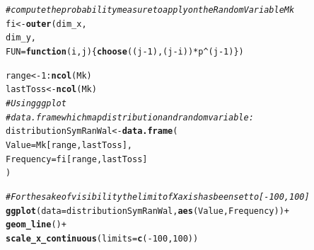 \documentclass{article}\usepackage[]{graphicx}\usepackage[]{color}
\makeatletter
\newcommand{\hlnum}[1]{\textcolor[rgb]{0.686,0.059,0.569}{#1}}%
\newcommand{\hlcom}[1]{\textcolor[rgb]{0.678,0.584,0.686}{\textit{#1}}}%
\newcommand{\hlopt}[1]{\textcolor[rgb]{0,0,0}{#1}}%
\newcommand{\hlstd}[1]{\textcolor[rgb]{0.345,0.345,0.345}{#1}}%
\newcommand{\hlkwa}[1]{\textcolor[rgb]{0.161,0.373,0.58}{\textbf{#1}}}%
\newcommand{\hlkwb}[1]{\textcolor[rgb]{0.69,0.353,0.396}{#1}}%
\newcommand{\hlkwc}[1]{\textcolor[rgb]{0.333,0.667,0.333}{#1}}%
\newcommand{\hlkwd}[1]{\textcolor[rgb]{0.737,0.353,0.396}{\textbf{#1}}}%
\newenvironment{kframe}{%
 \def\at@end@of@kframe{}%
 \ifinner\ifhmode%
  \def\at@end@of@kframe{\end{minipage}}%
  \begin{minipage}{\columnwidth}%
 \fi\fi%
 \def\FrameCommand##1{\hskip\@totalleftmargin \hskip-\fboxsep
 \colorbox{shadecolor}{##1}\hskip-\fboxsep
     \hskip-\linewidth \hskip-\@totalleftmargin \hskip\columnwidth}%
 \MakeFramed {\advance\hsize-\width
   \@totalleftmargin\z@ \linewidth\hsize
   \@setminipage}}%
 {\par\unskip\endMakeFramed%
 \at@end@of@kframe}
\newenvironment{knitrout}{}{} %
\makeatother
\begin{document}
\begin{knitrout}
\color{fgcolor}\begin{kframe}
\begin{alltt}
\hlcom{# compute the probability measure to apply on the Random Variable Mk}
\hlstd{fi} \hlkwb{<-} \hlkwd{outer}\hlstd{(dim_x,}
            \hlstd{dim_y,}
            \hlkwc{FUN} \hlstd{=} \hlkwa{function}\hlstd{(}\hlkwc{i}\hlstd{,} \hlkwc{j}\hlstd{)\{}\hlkwd{choose}\hlstd{((j}\hlopt{-}\hlnum{1}\hlstd{), (j}\hlopt{-}\hlstd{i))} \hlopt{*} \hlstd{p}\hlopt{^}\hlstd{(j}\hlopt{-}\hlnum{1}\hlstd{)\})}
\end{alltt}
\end{kframe}
\end{knitrout}

\begin{knitrout}
\color{fgcolor}\begin{kframe}
\begin{alltt}
 \hlstd{range} \hlkwb{<-} \hlnum{1}\hlopt{:}\hlkwd{ncol}\hlstd{(Mk)}
\hlstd{lastToss} \hlkwb{<-} \hlkwd{ncol}\hlstd{(Mk)}
 \hlcom{# Using ggplot}
\hlcom{# data.frame which map distribution and random variable:}
\hlstd{distributionSymRanWal} \hlkwb{<-} \hlkwd{data.frame}\hlstd{(}
  \hlkwc{Value} \hlstd{= Mk[range, lastToss],}
  \hlkwc{Frequency} \hlstd{= fi[range, lastToss]}
\hlstd{)}

\hlcom{# For the sake of visibility the limit of X axis has been set to [-100, 100]}
\hlkwd{ggplot}\hlstd{(}\hlkwc{data} \hlstd{= distributionSymRanWal,} \hlkwd{aes}\hlstd{(Value, Frequency))} \hlopt{+}
  \hlkwd{geom_line}\hlstd{()} \hlopt{+}
  \hlkwd{scale_x_continuous}\hlstd{(}\hlkwc{limits} \hlstd{=} \hlkwd{c}\hlstd{(}\hlopt{-}\hlnum{100}\hlstd{,} \hlnum{100}\hlstd{))}
\end{alltt}



\end{kframe}
\end{knitrout}
\end{document}
